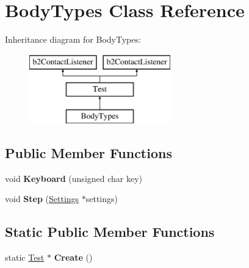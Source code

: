 \hypertarget{class_body_types}{\section{Body\-Types Class Reference}
\label{class_body_types}
}
Inheritance diagram for Body\-Types\-:\begin{figure}[H]
\begin{center}
\leavevmode
\includegraphics[height=3.000000cm]{class_body_types}
\end{center}
\end{figure}
\subsection*{Public Member Functions}
\begin{DoxyCompactItemize}
\item 
\hypertarget{class_body_types_aa46b2cfaba9a3cc4194be54247b2f491}{void {\bfseries Keyboard} (unsigned char key)}\label{class_body_types_aa46b2cfaba9a3cc4194be54247b2f491}

\item 
\hypertarget{class_body_types_aaebfd5f9e5008b56cd6f6a9618e8a558}{void {\bfseries Step} (\hyperlink{struct_settings}{Settings} $\ast$settings)}\label{class_body_types_aaebfd5f9e5008b56cd6f6a9618e8a558}

\end{DoxyCompactItemize}
\subsection*{Static Public Member Functions}
\begin{DoxyCompactItemize}
\item 
\hypertarget{class_body_types_a20a9fad171d0e8ff05279d7d61e0b7a1}{static \hyperlink{class_test}{Test} $\ast$ {\bfseries Create} ()}\label{class_body_types_a20a9fad171d0e8ff05279d7d61e0b7a1}

\end{DoxyCompactItemize}
